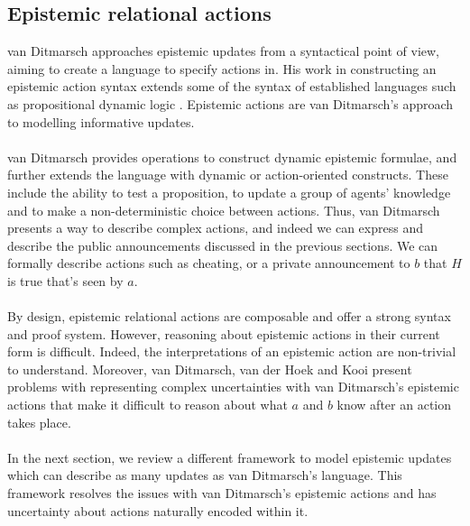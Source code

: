 \subsection{Epistemic relational actions} \label{epi_acts}
van Ditmarsch approaches epistemic updates from a syntactical point of view,
aiming to create a language to specify actions in.
His work in constructing an epistemic action syntax extends some of the
syntax of established languages such as propositional dynamic
logic \cite{ditmarsch99knowledge,ditmarsch2002dga}.
Epistemic actions are van Ditmarsch's approach to modelling informative updates.\\
\\
van Ditmarsch provides operations to construct dynamic epistemic formulae, and
further extends the language with dynamic or action-oriented constructs.
These include the ability to test a proposition, to update a group of agents'
knowledge and to make a non-deterministic choice between actions.
Thus, van Ditmarsch presents a way to describe complex actions, and indeed we can
express and describe the public announcements discussed in the previous sections.
We can formally describe actions such as cheating, or a private
announcement to $b$ that $H$ is true that's seen by $a$.\\
\\
By design, epistemic relational actions are composable and offer a strong syntax and proof system.
However, reasoning about epistemic actions in their current form is difficult.
Indeed, the interpretations of an epistemic action are non-trivial to
understand.
Moreover, van Ditmarsch, van der Hoek and Kooi present problems with
representing complex uncertainties with van Ditmarsch's epistemic actions that make it difficult
to reason about what $a$ and $b$ know after an action takes place.\\
\\
In the next section, we review a different framework to model epistemic updates
which can describe as many updates as van Ditmarsch's language.
This framework resolves the issues with van Ditmarsch's epistemic actions and
has uncertainty about actions naturally encoded within it.
